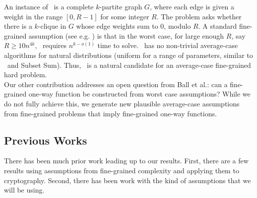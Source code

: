 An instance of \zkclique~is a complete $k$-partite graph $G$, where each edge is given a weight in the range $[0,R-1]$ for some integer $R$. The problem asks whether there is a $k$-clique in $G$ whose edge weights sum to $0$, modulo $R$. A standard fine-grained assumption (see e.g. \cite{icm-survey}) is that in the worst case, for large enough $R$, say $R\geq 10n^{4k}$, \zkclique~requires $n^{k-o(1)}$ time to solve. 
\zkclique~has no non-trivial average-case algorithms for natural distributions (uniform for a range of parameters, similar to \kSum~and Subset Sum). Thus, \zkclique~is a natural candidate for an average-case fine-grained hard problem.
\\






Our other contribution addresses an open question from Ball et al.: can a fine-grained one-way function be constructed from worst case assumptions? While we do not fully achieve this, we generate new plausible average-case assumptions from fine-grained problems that imply fine-grained one-way functions. %

\subsection{Previous Works}
There has been much prior work leading up to our results. First, there are a few results using assumptions from fine-grained complexity and applying them to cryptography. Second, there has been work with the kind of assumptions that we will be using. 


